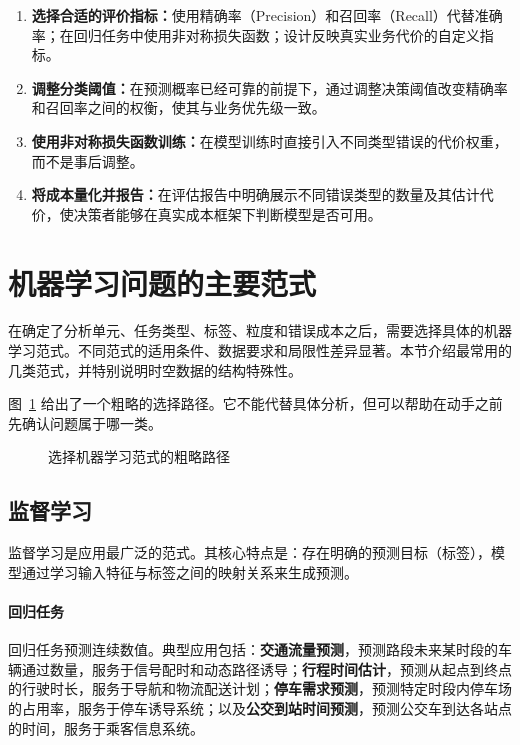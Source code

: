 \begin{enumerate}
  \item \textbf{选择合适的评价指标：}使用精确率（Precision）和召回率（Recall）代替准确率；在回归任务中使用非对称损失函数；设计反映真实业务代价的自定义指标。
  \item \textbf{调整分类阈值：}在预测概率已经可靠的前提下，通过调整决策阈值改变精确率和召回率之间的权衡，使其与业务优先级一致。
  \item \textbf{使用非对称损失函数训练：}在模型训练时直接引入不同类型错误的代价权重，而不是事后调整。
  \item \textbf{将成本量化并报告：}在评估报告中明确展示不同错误类型的数量及其估计代价，使决策者能够在真实成本框架下判断模型是否可用。
\end{enumerate}

\section{机器学习问题的主要范式}

在确定了分析单元、任务类型、标签、粒度和错误成本之后，需要选择具体的机器学习范式。不同范式的适用条件、数据要求和局限性差异显著。本节介绍最常用的几类范式，并特别说明时空数据的结构特殊性。

图~\ref{fig:ch03_tree} 给出了一个粗略的选择路径。它不能代替具体分析，但可以帮助在动手之前先确认问题属于哪一类。

\begin{figure}[H]
  \centering
  \caption{选择机器学习范式的粗略路径}
  \label{fig:ch03_tree}
\end{figure}

\subsection{监督学习}

监督学习是应用最广泛的范式。其核心特点是：存在明确的预测目标（标签），模型通过学习输入特征与标签之间的映射关系来生成预测。

\paragraph{回归任务}

回归任务预测连续数值。典型应用包括：\textbf{交通流量预测}，预测路段未来某时段的车辆通过数量，服务于信号配时和动态路径诱导；\textbf{行程时间估计}，预测从起点到终点的行驶时长，服务于导航和物流配送计划；\textbf{停车需求预测}，预测特定时段内停车场的占用率，服务于停车诱导系统；以及\textbf{公交到站时间预测}，预测公交车到达各站点的时间，服务于乘客信息系统。

